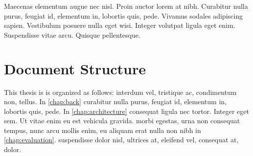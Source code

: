 Maecenas elementum augue nec nisl. Proin auctor lorem at nibh. Curabitur nulla purus, feugiat id, elementum in, lobortis quis, pede. Vivamus sodales adipiscing sapien. Vestibulum posuere nulla eget wisi. Integer volutpat ligula eget enim. Suspendisse vitae arcu. Quisque pellentesque.
\section{Document Structure}
This thesis is is organized as follows:  interdum vel, tristique ac, condimentum non, tellus. 
In \cref{chap:back} curabitur nulla purus, feugiat id, elementum in, lobortis quis, pede.
In \cref{chap:architecture} consequat ligula nec tortor. Integer eget sem. Ut vitae enim eu est vehicula gravida.
 morbi egestas, urna non consequat tempus, nunc arcu mollis enim, eu aliquam erat nulla non nibh in \cref{chap:evaluation}.
 suspendisse dolor nisl, ultrices at, eleifend vel, consequat at, dolor.